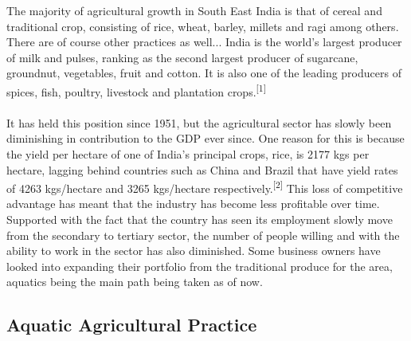 \documentclass[a4paper,11pt]{proc}
\begin{document}
The majority of agricultural growth in South East India is that of cereal and traditional crop, consisting of rice, wheat, barley, millets and ragi among others. There are of course other practices as well... India is the world's largest producer of milk and pulses, ranking as the second largest producer of sugarcane, groundnut, vegetables, fruit and cotton. It is also one of the leading producers of spices, fish, poultry, livestock and plantation crops.\textsuperscript{[1]} \\
\\It has held this position since 1951, but the agricultural sector has slowly been diminishing in contribution to the GDP ever since. One reason for this is because the yield per hectare of one of India’s principal crops, rice, is 2177 kgs per hectare, lagging behind countries such as China and Brazil that have yield rates of 4263 kgs/hectare and 3265 kgs/hectare respectively.\textsuperscript{[2]} This loss of competitive advantage has meant that the industry has become less profitable over time. Supported with the fact that the country has seen its employment slowly move from the secondary to tertiary sector, the number of people willing and with the ability to work in the sector has also diminished. Some business owners have looked into expanding their portfolio from the traditional produce for the area, aquatics being the main path being taken as of now.

\subsection{Aquatic Agricultural Practice}
\end{document}
